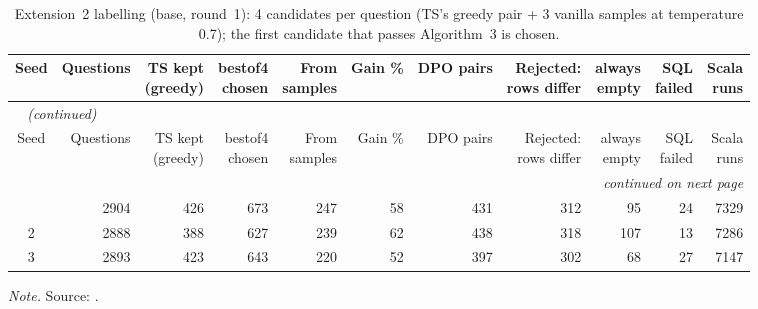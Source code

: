 \begin{landscape}
{\small
{}
\setlength{\tabcolsep}{4.2pt}
\begin{longtable}{@{}crrrrrrrrrr@{}}
\caption{Extension~2 labelling (base, round~1): 4 candidates per question (TS's greedy pair + 3 vanilla samples at temperature 0.7); the first candidate that passes Algorithm~3 is chosen.}\label{tab:gen-ext2-labels}\\
\toprule
\rowcolor{headshade}Seed & Questions & \makecell{TS kept\\(greedy)} & \makecell{bestof4\\chosen} & \makecell{From\\samples} & Gain \% & DPO pairs & \makecell{Rejected:\\rows differ} & \makecell{always\\empty} & \makecell{SQL\\failed} & \makecell{Scala\\runs}\\
\midrule
\endfirsthead
\multicolumn{11}{l}{\textit{\tablename~\thetable{} (continued)}}\\
\toprule
\rowcolor{headshade}Seed & Questions & \makecell{TS kept\\(greedy)} & \makecell{bestof4\\chosen} & \makecell{From\\samples} & Gain \% & DPO pairs & \makecell{Rejected:\\rows differ} & \makecell{always\\empty} & \makecell{SQL\\failed} & \makecell{Scala\\runs}\\
\midrule
\endhead
\midrule
\multicolumn{11}{r}{\textit{continued on next page}}\\
\endfoot
\bottomrule
\endlastfoot
1 & 2904 & 426 & 673 & 247 & 58 & 431 & 312 & 95 & 24 & 7329\\
2 & 2888 & 388 & 627 & 239 & 62 & 438 & 318 & 107 & 13 & 7286\\
3 & 2893 & 423 & 643 & 220 & 52 & 397 & 302 & 68 & 27 & 7147\\
\end{longtable}
}
\vspace{-0.6\baselineskip}
{\footnotesize\color{slate}\textit{Note.} Source: .\par}
\medskip
\end{landscape}
